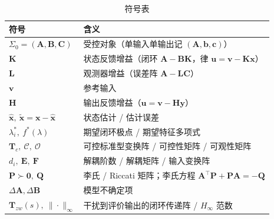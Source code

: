 \begin{table}[H]\centering\small
\caption{符号表}
\begin{tabular}{ll}
\toprule
符号 & 含义 \\
\midrule
$\Sigma_0=(\mathbf A,\mathbf B,\mathbf C)$ & 受控对象（单输入单输出记 $(\mathbf A,\mathbf b,\mathbf c)$） \\
$\mathbf K$ & 状态反馈增益（闭环 $\mathbf A-\mathbf B\mathbf K$，律 $\mathbf u=\mathbf v-\mathbf K\mathbf x$） \\
$\mathbf L$ & 观测器增益（误差阵 $\mathbf A-\mathbf L\mathbf C$） \\
$\mathbf v$ & 参考输入 \\
$\mathbf H$ & 输出反馈增益（$\mathbf u=\mathbf v-\mathbf H\mathbf y$） \\
$\hat{\mathbf x},\ \tilde{\mathbf x}=\mathbf x-\hat{\mathbf x}$ & 状态估计 / 估计误差 \\
$\lambda_i^*,\ f^*(\lambda)$ & 期望闭环极点 / 期望特征多项式 \\
$\mathbf T_c,\ \mathcal C,\ \mathcal O$ & 可控标准型变换阵 / 可控性矩阵 / 可观性矩阵 \\
$d_i,\ \mathbf E,\ \mathbf F$ & 解耦阶数 / 解耦矩阵 / 输入变换阵 \\
$\mathbf P\succ\mathbf 0,\ \mathbf Q$ & 李氏 / Riccati 矩阵；李氏方程 $\mathbf A^\top\mathbf P+\mathbf P\mathbf A=-\mathbf Q$ \\
$\Delta\mathbf A,\Delta\mathbf B$ & 模型不确定项 \\
$\mathbf T_{zw}(s),\ \|\cdot\|_\infty$ & 干扰到评价输出的闭环传递阵 / $H_\infty$ 范数 \\
\bottomrule
\end{tabular}
\end{table}

